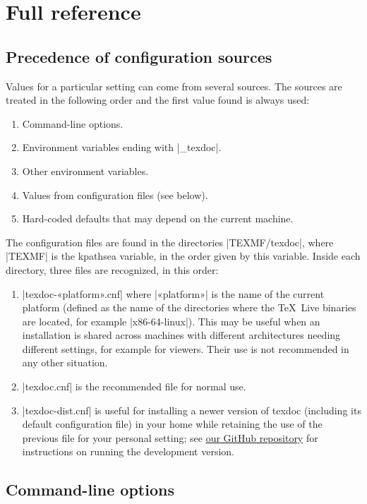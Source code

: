 \documentclass[a4paper, oneside]{scrartcl}
\newcommand\texlive{\TeX~Live\xspace}
\begin{document}
\section{Full reference}

\subsection{Precedence of configuration sources}\label{ss-prec}

Values for a particular setting can come from several sources. The sources are
treated in the following order and the first value found is always used:
\begin{enumerate}
  \item Command-line options.
  \item Environment variables ending with |_texdoc|.
  \item Other environment variables.
  \item Values from configuration files (see below).
  \item Hard-coded defaults that may depend on the current machine.
\end{enumerate}

The configuration files are found in the directories |TEXMF/texdoc|, where
|TEXMF| is the kpathsea variable, in the order given by this variable. Inside
each directory, three files are recognized, in this order:
\begin{enumerate}
  \item |texdoc-«platform».cnf| where |«platform»| is the name of the current
    platform (defined as the name of the directories where the \texlive
    binaries are located, for example |x86-64-linux|). This may be useful when
    an installation is shared across machines with different architectures
    needing different settings, for example for viewers. Their use is not
    recommended in any other situation.
  \item |texdoc.cnf| is the recommended file for normal use.
  \item |texdoc-dist.cnf| is useful for installing a newer version of texdoc
    (including its default configuration file) in your home while retaining
    the use of the previous file for your personal setting; see
    \href{https://github.com/TeX-Live/texdoc}{our GitHub repository} for
    instructions on running the development version.
\end{enumerate}

\subsection{Command-line options}\label{ss-cl}
\end{document}
